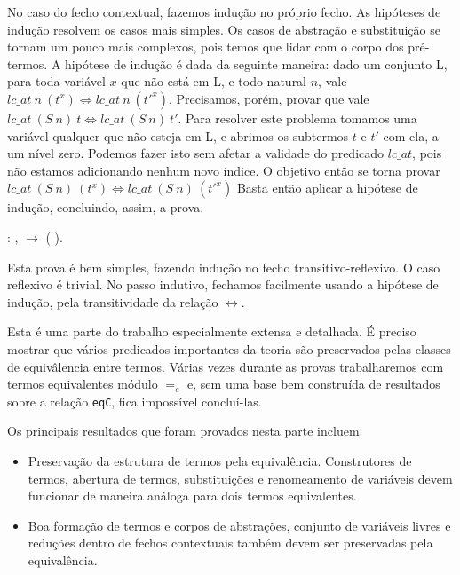 No caso do fecho contextual, fazemos indução no próprio fecho. As hipóteses de
indução resolvem os casos mais simples. Os casos de abstração e substituição se
tornam um pouco mais complexos, pois temos que lidar com o corpo dos pré-termos.
A hipótese de indução é dada da seguinte maneira: dado um conjunto L, para toda
variável $x$ que não está em L, e todo natural $n$, vale $lc\_at\ n\ (t^x)
\iff lc\_at\ n\ (t'^x)$. Precisamos, porém, provar que vale $lc\_at\ (S\ n)\ t
\iff lc\_at\ (S\ n)\ t'$. Para resolver este problema tomamos uma variável qualquer
que não esteja em L, e abrimos os subtermos $t$ e $t'$ com ela, a um nível zero.
Podemos fazer isto sem afetar a validade do predicado $lc\_at$, pois não
estamos adicionando nenhum novo índice. O objetivo então se torna provar
$lc\_at\ (S\ n)\ (t^x) \iff lc\_at\ (S\ n)\ (t'^x)$ Basta então aplicar a hipótese de
indução, concluindo, assim, a prova.

\bigskip 
\coqnoindent {}  :
\coqdockw{\ensuremath{\forall}}   ,
 
 \ensuremath{\rightarrow} (
  
  ).\coqdoceol
\bigskip

Esta prova é bem simples, fazendo indução no fecho transitivo-reflexivo. O caso
reflexivo é trivial. No passo indutivo, fechamos facilmente usando a hipótese de
indução, pela transitividade da relação $\leftrightarrow$.


Esta é uma parte do trabalho especialmente extensa e detalhada. É preciso
mostrar que vários predicados importantes da teoria são preservados pelas
classes de equivâlencia entre termos. Várias vezes durante as provas
trabalharemos com termos equivalentes módulo $=_e$ e, sem uma base bem
construída de resultados sobre a relação \texttt{eqC}, fica impossível
concluí-las.

Os principais resultados que foram provados nesta parte incluem:

\begin{itemize}
    \item Preservação da estrutura de termos pela equivalência. Construtores de
        termos, abertura de termos, substituições e renomeamento de variáveis
        devem funcionar de maneira análoga para dois termos equivalentes.
    \item Boa formação de termos e corpos de abstrações, conjunto de variáveis
        livres e reduções dentro de fechos contextuais também devem ser
        preservadas pela equivalência.
\end{itemize}

